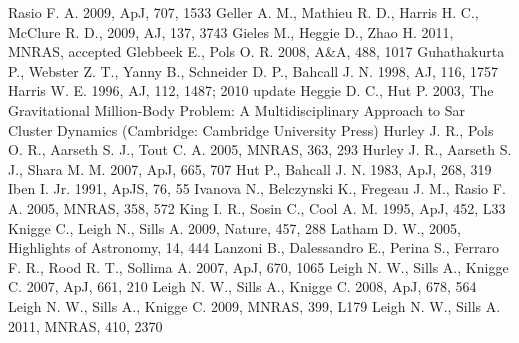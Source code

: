 \begin{thebibliography}{99}
  Rasio F. A. 2009, ApJ, 707, 1533
  Geller A. M., Mathieu R. D., Harris H. C., McClure R. D., 2009,
  AJ, 137, 3743
  Gieles M., Heggie D., Zhao H. 2011, MNRAS, accepted
 Glebbeek E., Pols
  O. R. 2008, A\&A, 488, 1017
 Guhathakurta 
  P., Webster Z. T., Yanny B., Schneider D. P., Bahcall J. N. 1998,
  AJ, 116, 1757
 Harris W. E. 1996, AJ, 112,
  1487; 2010 update
  Heggie D. C., Hut P. 2003, The Gravitational Million-Body Problem:
  A Multidisciplinary Approach to Sar Cluster Dynamics (Cambridge:
  Cambridge University Press)
  Hurley J. R., Pols O. R., Aarseth S. J., Tout C. A. 2005, MNRAS,
  363, 293
 Hurley J. R., Aarseth S. J., Shara M. M. 2007, ApJ, 665, 707
 Hut P., Bahcall J. N. 1983, ApJ,
  268, 319 
 Iben I. Jr. 1991, ApJS, 76, 55
  Ivanova N., Belczynski K., Fregeau J. M., Rasio F. A. 2005, MNRAS, 358, 572
  King I. R., Sosin C., Cool A. M. 1995, ApJ, 452, L33
 Knigge C., Leigh
  N., Sills A. 2009, Nature, 457, 288
 Latham
  D. W., 2005, Highlights of Astronomy, 14, 444
  Lanzoni B., Dalessandro E., Perina S., Ferraro F. R., Rood R. T.,
  Sollima A. 2007, ApJ, 670, 1065
 Leigh
  N. W., Sills A., Knigge C. 2007, ApJ, 661, 210
 Leigh
  N. W., Sills A., Knigge C. 2008, ApJ, 678, 564
 Leigh
  N. W., Sills A., Knigge C. 2009, MNRAS, 399, L179
 Leigh
  N. W., Sills A. 2011, MNRAS, 410, 2370

\end{thebibliography}
